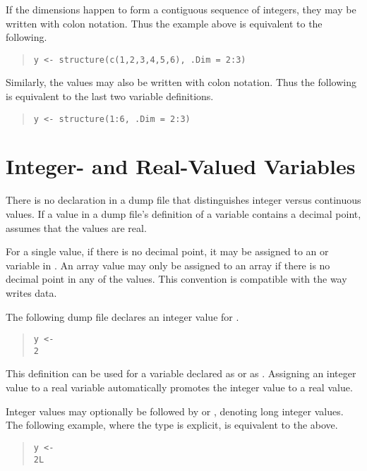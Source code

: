 If the dimensions happen to form a contiguous sequence of integers,
they may be written with colon notation.  Thus the example above is
equivalent to the following.
%
\begin{quote}
\begin{verbatim}
y <- structure(c(1,2,3,4,5,6), .Dim = 2:3)
\end{verbatim}
\end{quote}
%
Similarly, the values may also be written with colon notation.  Thus
the following is equivalent to the last two variable definitions.
%
\begin{quote}
\begin{verbatim}
y <- structure(1:6, .Dim = 2:3)
\end{verbatim}
\end{quote}



\section{Integer- and Real-Valued Variables}

There is no declaration in a dump file that distinguishes integer
versus continuous values.  If a value in a dump file's definition of a
variable contains a decimal point, \Stan assumes that the values are
real.  

For a single value, if there is no decimal point, it may be assigned
to an  or  variable in \Stan.  An array value may
only be assigned to an  array if there is no decimal point
in any of the values.  This convention is compatible with the way \R
writes data.

The following dump file declares an integer value for .
%
\begin{quote}
\begin{Verbatim} 
y <- 
2
\end{Verbatim}
\end{quote}
% 
This definition can be used for a \Stan variable  declared as
 or as .  Assigning an integer value to a real
variable automatically promotes the integer value to a real value.

Integer values may optionally be followed by  or ,
denoting long integer values.  The following example, where the type is
explicit, is equivalent to the above.
%
\begin{quote}
\begin{Verbatim} 
y <- 
2L
\end{Verbatim}
\end{quote}

